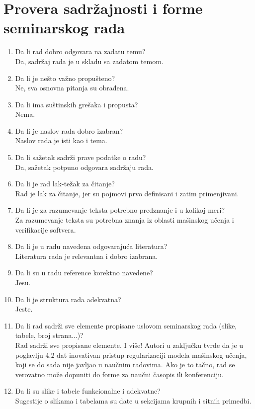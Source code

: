 \documentclass[a4paper]{report}
\begin{document}
\section{Provera sadržajnosti i forme seminarskog rada}

\begin{enumerate}
\item Da li rad dobro odgovara na zadatu temu?\\Da, sadržaj rada je u skladu sa zadatom temom.
\item Da li je nešto važno propušteno?\\Ne, sva osnovna pitanja su obrađena.
\item Da li ima suštinskih grešaka i propusta?\\Nema.
\item Da li je naslov rada dobro izabran?\\Naslov rada je isti kao i tema.
\item Da li sažetak sadrži prave podatke o radu?\\Da, sažetak potpuno odgovara sadržaju rada.
\item Da li je rad lak-težak za čitanje?\\Rad je lak za čitanje, jer su pojmovi prvo definisani i zatim primenjivani.
\item Da li je za razumevanje teksta potrebno predznanje i u kolikoj meri?\\Za razumevanje teksta su potrebna znanja iz oblasti mašinskog učenja i verifikacije softvera.
\item Da li je u radu navedena odgovarajuća literatura?\\Literatura rada je relevantna i dobro izabrana.
\item Da li su u radu reference korektno navedene?\\Jesu.
\item Da li je struktura rada adekvatna?\\Jeste.
\item Da li rad sadrži sve elemente propisane uslovom seminarskog rada (slike, tabele, broj strana...)?\\Rad sadrži sve propisane elemente. I više! Autori u zaključku tvrde da je u poglavlju 4.2 dat inovativan pristup regularizaciji modela mašinskog učenja, koji se do sada nije javljao u naučnim radovima. Ako je to tačno, rad se verovatno može dopuniti do forme za naučni časopis ili konferenciju.
\item Da li su slike i tabele funkcionalne i adekvatne?\\Sugestije o slikama i tabelama su date u sekcijama krupnih i sitnih primedbi.
\end{enumerate}
\end{document}
